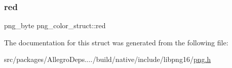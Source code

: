 \mbox{\label{structpng__color__struct_ad39dc2d7cb82e3670a3ad397bb4083cb}} 
\subsubsection{\texorpdfstring{red}{red}}
{\footnotesize\ttfamily png\+\_\+byte png\+\_\+color\+\_\+struct\+::red}



The documentation for this struct was generated from the following file\+:\begin{DoxyCompactItemize}
\item 
src/packages/\+Allegro\+Deps..../build/native/include/libpng16/\hyperlink{libpng16_2png_8h}{png.\+h}\end{DoxyCompactItemize}
